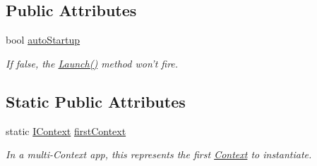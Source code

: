 \subsection*{Public Attributes}
\begin{DoxyCompactItemize}
\item 
\hypertarget{classstrange_1_1extensions_1_1context_1_1impl_1_1_context_a3386ea2967ba720218b89eaefac77d56}{bool \hyperlink{classstrange_1_1extensions_1_1context_1_1impl_1_1_context_a3386ea2967ba720218b89eaefac77d56}{auto\-Startup}}\label{classstrange_1_1extensions_1_1context_1_1impl_1_1_context_a3386ea2967ba720218b89eaefac77d56}

\begin{DoxyCompactList}\small\item\em If false, the {\ttfamily \hyperlink{classstrange_1_1extensions_1_1context_1_1impl_1_1_context_a02c426aaa7b4cdae6bc1be3060b67dce}{Launch()}} method won't fire. \end{DoxyCompactList}\end{DoxyCompactItemize}
\subsection*{Static Public Attributes}
\begin{DoxyCompactItemize}
\item 
\hypertarget{classstrange_1_1extensions_1_1context_1_1impl_1_1_context_a91925d82f688390fea8c703ab4135c79}{static \hyperlink{interfacestrange_1_1extensions_1_1context_1_1api_1_1_i_context}{I\-Context} \hyperlink{classstrange_1_1extensions_1_1context_1_1impl_1_1_context_a91925d82f688390fea8c703ab4135c79}{first\-Context}}\label{classstrange_1_1extensions_1_1context_1_1impl_1_1_context_a91925d82f688390fea8c703ab4135c79}

\begin{DoxyCompactList}\small\item\em In a multi-\/\-Context app, this represents the first \hyperlink{classstrange_1_1extensions_1_1context_1_1impl_1_1_context}{Context} to instantiate. \end{DoxyCompactList}\end{DoxyCompactItemize}
